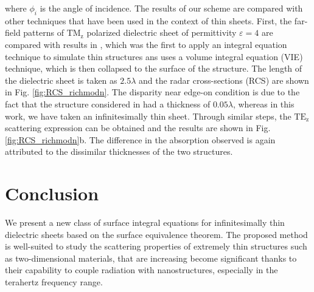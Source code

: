 \documentclass{ieeeaccess}
\newcommand{\E}{\varepsilon}  %
\renewcommand{\^}{\hat}  %
\begin{document}
where $\phi_i$ is the angle of incidence. The results of our scheme are compared with other techniques that have been used in the context of thin sheets. First, the far-field patterns of $\mathrm{TM_z}$ polarized dielectric sheet of permittivity $\E = 4$ are compared with results in \cite{Richmond1965}, which was the first to apply an integral equation technique to simulate thin structures ans uses a volume integral equation (VIE) technique, which is then collapsed to the surface of the structure. The length of the dielectric sheet is taken as $2.5 \lambda$ and the radar cross-sections (RCS) are shown in Fig. \ref{fig:RCS_richmodn}. The disparity near edge-on condition is due to the fact that the structure considered in \cite{Richmond1965} had a thickness of $0.05 \lambda$, whereas in this work, we have taken an infinitesimally thin sheet. Through  similar steps, the $\mathrm{TE_z}$ scattering expression can be obtained and the results are shown in Fig. \ref{fig:RCS_richmodn}b. The difference in the absorption observed is again attributed to the dissimilar thicknesses of the two structures.
% 

%
%
%
%
\section{Conclusion}
We present a new class of surface integral equations for infinitesimally thin dielectric sheets based on the surface equivalence theorem. The proposed method is well-suited to study the scattering properties of extremely thin structures such as two-dimensional materials, that are increasing become significant thanks to their capability to couple radiation with nanostructures, especially in the terahertz frequency range.







\EOD
\end{document}
